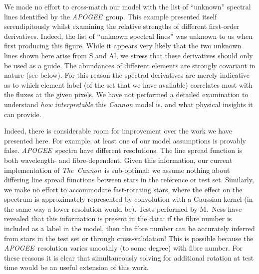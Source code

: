 \documentclass[12pt,preprint]{aastex}
\newcommand{\project}[1]{\textsl{#1}}
\newcommand{\TheCannon}{\project{The~Cannon}}
\newcommand{\tc}{\TheCannon}
\newcommand{\acronym}[1]{{\small{#1}}}
\newcommand{\apogee}{\project{\acronym{APOGEE}}}
\begin{document}
We made no effort to cross-match our model with the list of ``unknown'' spectral lines
identified by the \apogee\ group.  This example presented itself
serendipitously whilst examining the relative strengths of different
first-order derivatives.  Indeed, the list of ``unknown spectral lines''
was unknown to us when first producing this figure.  While it appears
very likely that the two unknown lines shown here arise from S and Al,
we stress that these derivatives should only be used as a guide.  The
abundances of different elements are strongly covariant in nature (see below).
For this reason the spectral derivatives are merely indicative as to
which element label (of the set that we have available) correlates
most with the fluxes at the given pixels.  We have not performed
a detailed examination to understand \emph{how interpretable} this
\emph{Cannon} model is, and what physical insights it can provide.


Indeed, there is considerable room for improvement over the work
we have presented here.  For example, at least one of our model 
assumptions is provably false. \apogee\ spectra have
different resolutions.  The line spread function is both wavelength- and 
fibre-dependent.  Given this information, our current implementation of \tc\ is  
sub-optimal: we assume nothing about differing line spread functions between 
stars in the reference or test set.  Similarly, we make no effort to 
accommodate fast-rotating stars, where the effect on the spectrum is 
approximately represented by convolution with a Gaussian kernel (in the same way
a lower resolution would be).  Tests performed by M.~Ness have revealed that 
this information is present in the data: if the fibre number is included as a
label in the model, then the fibre number can be accurately inferred from stars
in the test set or through cross-validation!  This is possible because the 
\apogee\ resolution varies smoothly (to some degree) with fibre number.  For 
these reasons it is clear that simultaneously solving for additional rotation
at test time would be an useful extension of this work.  


\end{document}
